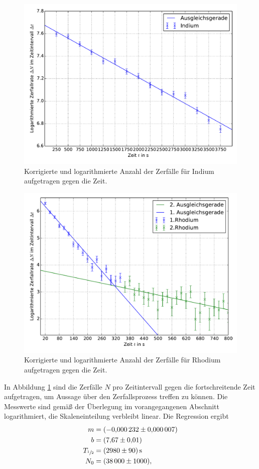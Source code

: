 \begin{figure}[p]
    \centering
    \includegraphics[height=0.5\textheight]{Bilder/indium.pdf}
    \caption{Korrigierte und logarithmierte Anzahl der Zerfälle für Indium aufgetragen gegen die Zeit.}
    \label{fig:indium}
\end{figure}
\begin{figure}[p]
    \centering
    \includegraphics[height=0.5\textheight]{Bilder/rhodium.pdf}
    \caption{Korrigierte und logarithmierte Anzahl der Zerfälle für Rhodium aufgetragen gegen die Zeit.}
    \label{fig:rhodium}
\end{figure}

In Abbildung \ref{fig:indium} sind die Zerfälle $N$ pro Zeitintervall gegen die fortschreitende Zeit aufgetragen, um Aussage über den Zerfallsprozess treffen zu können.
Die Messwerte sind gemäß der Überlegung im vorangegangenen Abschnitt logarithmiert, die Skaleneinteilung verbleibt linear.
Die Regression ergibt 
\begin{align}
	m &=\SI{-0.000232(7)}{}\\
	b &=\SI{7.67(1)}{}\\
	T_{\sfrac{1}{2}}&= \SI{2980(90)}{\second}\\
	N_0&=\SI{38000(1000)}{},
\end{align}

